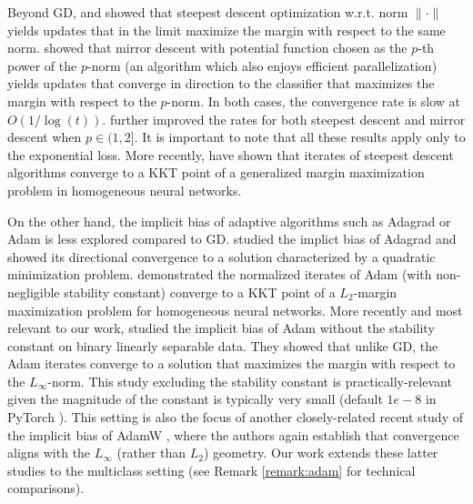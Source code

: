 Beyond GD, \cite{gunasekar2018characterizing} and \cite{nacson2019convergence} showed that steepest descent optimization w.r.t. norm  $\|\cdot\|$ yields updates that in the limit maximize the margin with respect to the same norm.
\cite{sun2022mirror} showed that mirror descent  with potential function chosen as the $p$-th power of the $p$-norm (an algorithm which also enjoys efficient parallelization) yields updates that converge in direction to the classifier that maximizes the margin with respect to the $p$-norm. In both  cases, the convergence rate  is slow at $O(1/\log(t))$. \citet{wang2023faster} further improved the rates for both steepest descent and mirror descent when $p \in (1,2]$. It is important to note that all these results apply only to the exponential loss. More recently, \citet{tsilivis2024flavors} have shown that iterates of steepest descent algorithms converge to a KKT point of a generalized margin maximization problem in homogeneous neural networks.

On the other hand, the implicit bias of adaptive algorithms such as Adagrad \citep{duchi2011adaptive} or Adam \citep{kingma2014adam} is less explored compared to GD. \cite{qian2019implicit} studied the implict bias of Adagrad and showed its directional convergence to a solution characterized by a quadratic minimization problem. \cite{wang2021implicit,wang2022does} demonstrated the normalized iterates of Adam (with non-negligible stability constant) converge to a KKT point of a $L_2$-margin maximization problem for homogeneous neural networks. More recently and most relevant to our work, \cite{zhang2024implicit} studied the implicit bias of Adam without the stability constant on binary linearly separable data. They showed that unlike GD, the Adam iterates converge to a solution that maximizes the margin with respect to the $L_{\infty}$-norm. 
This study excluding the stability constant is practically-relevant given the magnitude of the constant is typically very small (default $1e-8$ in PyTorch \citep{pytorch}). This setting is also the focus of another closely-related  recent study of the implicit bias of AdamW \citep{xie2024implicit}, where the authors again establish that convergence aligns with the $L_{\infty}$ (rather than $L_{2}$) geometry. Our work extends these latter studies to the multiclass setting
(see Remark \ref{remark:adam} for technical comparisons).

